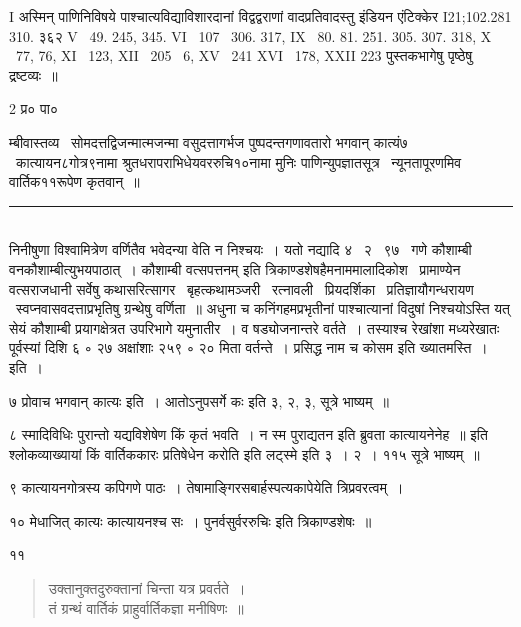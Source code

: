 \documentclass[11pt, openany]{book}
\begin{document}
\begin{multicols}{2}
I अस्मिन् पाणिनिविषये पाश्चात्यविद्याविशारदानां विद्वद्वराणां वादप्रतिवादस्तु {\qt इंडियन एंटिक्केर} I21;102.281 310. ३६२ V \textendash\ 49. 245, 345. VI \textendash\ 107 \textendash\ 306. 317, IX \textendash\ 80. 81. 251. 305. 307. 318, X \textendash\ 77, 76, XI \textendash\ 123, XII \textendash\ 205 \textendash\ 6, XV \textendash\ 241 XVI \textendash\ 178, XXII 223 पुस्तकभागेषु पृष्ठेषु द्रष्टव्यः~॥

2 प्र० पा०

\columnbreak

\noindent
म्बीवास्तव्य \textendash\ सोमदत्तद्विजन्मात्मजन्मा वसुदत्तागर्भज पुष्पदन्तगणावतारो भगवान् कात्यं७ \textendash\ कात्यायन८गोत्र९नामा श्रुतधरापराभिधेयवररुचि१०नामा मुनिः पाणिन्युपज्ञातसूत्र \textendash\ न्यूनतापूरणमिव वार्तिक११रूपेण कृतवान्~॥

\noindent
\rule{1\linewidth}{0.5pt}\\

\noindent
निनीषुणा विश्वामित्रेण वर्णितैव भवेदन्या वेति न निश्चयः~। यतो नद्यादि ४ \textendash\ २ \textendash\ ९७ \textendash\ गणे कौशाम्बी वनकौशाम्बीत्युभयपाठात्~। {\qt कौशाम्बी वत्सपत्तनम्} इति त्रिकाण्डशेषहैमनाममालादिकोश \textendash\ प्रामाण्येन वत्सराजधानी सर्वेषु कथासरित्सागर \textendash\ बृहत्कथामञ्जरी \textendash\ रत्नावली \textendash\ प्रियदर्शिका \textendash\ प्रतिज्ञायौगन्धरायण \textendash\ स्वप्नवासवदत्ताप्रभृतिषु ग्रन्थेषु वर्णिता~॥ अधुना च कनिंगहमप्रभृतीनां पाश्चात्यानां विदुषां निश्चयोऽस्ति यत् सेयं कौशाम्बी प्रयागक्षेत्रत उपरिभागे यमुनातीर~। व षड्योजनान्तरे वर्तते~। तस्याश्च रेखांशा मध्यरेखातः पूर्वस्यां दिशि ६ ∘ २७ अक्षांशाः २५९ ∘ २० मिता वर्तन्ते~। प्रसिद्ध नाम च कोसम इति ख्यातमस्ति~। इति~।

७ {\qt प्रोवाच भगवान् कात्यः} इति~। {\qt आतोऽनुपसर्गे कः} इति ३, २, ३, सूत्रे भाष्यम्~॥

८ {\qt स्मादिविधिः पुरान्तो यद्यविशेषेण किं कृतं भवति~। न स्म पुराद्यतन इति ब्रुवता कात्यायनेनेह~॥ } इति श्लोकव्याख्यायां {\qt किं वार्तिककारः प्रतिषेधेन करोति} इति {\qt लट्स्मे} इति ३~। २~। ११५ सूत्रे भाष्यम्~॥

९ कात्यायनगोत्रस्य कपिगणे पाठः~। तेषामाङ्गिरसबार्हस्पत्यकापेयेति त्रिप्रवरत्वम्~।

१० {\qt मेधाजित् कात्यः कात्यायनश्च सः~। पुनर्वसुर्वररुचिः} इति त्रिकाण्डशेषः~॥

११ \begin{quote}
{\qt उक्तानुक्तदुरुक्तानां चिन्ता यत्र प्रवर्तते~।\\
तं ग्रन्थं वार्तिकं प्राहुर्वार्तिकज्ञा मनीषिणः~॥}
\end{quote} 


\end{multicols}
\end{document}
